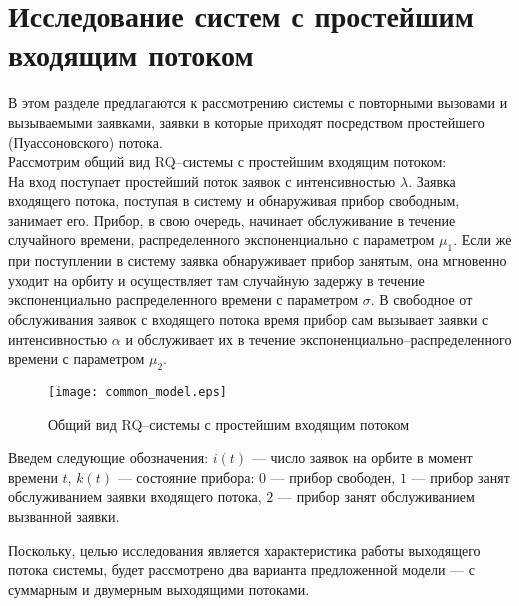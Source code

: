 \section {Исследование систем с простейшим входящим потоком}
В этом разделе предлагаются к рассмотрению системы с повторными вызовами и вызываемыми заявками, заявки в которые приходят посредством простейшего (Пуассоновского) потока.\\
Рассмотрим общий вид RQ--системы с простейшим входящим потоком:\\
 На вход поступает простейший поток заявок с интенсивностью $\lambda$. Заявка входящего потока, поступая в систему и обнаруживая прибор свободным, занимает его. Прибор, в свою очередь, начинает обслуживание в течение случайного времени, распределенного экспоненциально с параметром $\mu_{1}$. Если же при поступлении в систему заявка обнаруживает прибор занятым, она мгновенно уходит на орбиту и осуществляет там случайную задержу в течение экспоненциально распределенного времени с параметром $\sigma$. В свободное от обслуживания заявок с входящего потока время прибор сам вызывает заявки с интенсивностью $\alpha$ и обслуживает их в течение экспоненциально--распределенного времени с параметром $\mu_{2}$.
\begin{figure}[H]
	\centering
	\texttt{[image: common\_model.eps]}
	\caption{Общий вид RQ--системы с простейшим входящим потоком}
	\label{common_model_fig}
\end{figure}
Введем следующие обозначения: $i(t)$ --- число заявок на орбите в момент времени $t$, $k(t)$ --- состояние прибора: $0$ --- прибор свободен, $1$ --- прибор занят обслуживанием заявки входящего потока, $2$ --- прибор занят обслуживанием вызванной заявки. 
 
Поскольку, целью исследования является характеристика работы выходящего потока системы, будет рассмотрено два варианта предложенной модели --- с суммарным и двумерным выходящими потоками.


